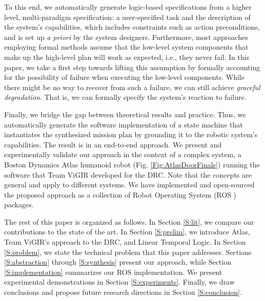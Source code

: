 To this end, we automatically generate logic-based specifications from a higher level, multi-paradigm specification: a user-specified task and the description of the system's capabilities, which includes constraints such as action preconditions, and is set up \emph{a priori} by the system designers.
Furthermore, most approaches employing formal methods assume that the low-level system components that make up the high-level plan will work as expected, i.e., they never fail.
In this paper, we take a first step towards lifting this assumption by formally accounting for the possibility of failure when executing the low-level components.
While there might be no way to recover from such a failure, we can still achieve \emph{graceful degradation}.
That is, we can formally specify the system's reaction to failure.

Finally, we bridge the gap between theoretical results and practice. 
Thus, we automatically generate the software implementation of a state machine that instantiates the synthesized mission plan by grounding it to the robotic system's capabilities.
The result is in an end-to-end approach.
We present and experimentally validate our approach in the context of a complex system, a Boston Dynamics Atlas humanoid robot (Fig. \ref{Fig:AtlasDoorFinals}) running the software that Team ViGIR developed for the DRC.
Note that the concepts are general and apply to different systems.
We have implemented and open-sourced the proposed approach as a collection of Robot Operating System (ROS \cite{ROS}) packages.

The rest of this paper is organized as follows.
In Section \ref{S:lit}, we compare our contributions to the state of the art.
In Section \ref{S:prelim}, we introduce Atlas, Team ViGIR's approach to the DRC, and Linear Temporal Logic.
In Section \ref{S:problem}, we state the technical problem that this paper addresses.
Sections \ref{S:abstraction} through \ref{S:synthesis} present our approach, while Section \ref{S:implementation} summarizes our ROS implementation.
We present experimental demonstrations in Section \ref{S:experiments}.
Finally, we draw conclusions and propose future research directions in Section \ref{S:conclusion}.

